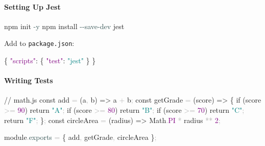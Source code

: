 \documentclass[
  justified,
  openright,
]{tufte-book}
\let\subsubsection\paragraph
\let\paragraph\paragraph
\newcommand{\AttributeTok}[1]{\textcolor{DarkSlateGray}{#1}}
\newcommand{\BuiltInTok}[1]{#1}
\newcommand{\CommentTok}[1]{\textcolor{MidGray}{#1}}
\newcommand{\ConstantTok}[1]{\textcolor{Purple}{#1}}
\newcommand{\ControlFlowTok}[1]{\textcolor{BrandBlue}{#1}}
\newcommand{\DataTypeTok}[1]{\textcolor{Purple}{#1}}
\newcommand{\DecValTok}[1]{\textcolor{Purple}{#1}}
\newcommand{\ExtensionTok}[1]{#1}
\newcommand{\FunctionTok}[1]{\textcolor{BrandBlue}{#1}}
\newcommand{\KeywordTok}[1]{\textcolor{BrandBlue}{#1}}
\newcommand{\NormalTok}[1]{#1}
\newcommand{\OperatorTok}[1]{\textcolor{DarkGray}{#1}}
\newcommand{\StringTok}[1]{\textcolor{Teal}{#1}}
\newenvironment{Shaded}{%
  \begin{snugshade}
}{%
  \end{snugshade}
}
\let\subsubsection\paragraph
\let\paragraph\paragraph
\begin{document}
\subsubsection{Setting Up Jest}\label{setting-up-jest}

\begin{Shaded}
\begin{Highlighting}[]
\ExtensionTok{npm}\NormalTok{ init }\AttributeTok{{-}y}
\ExtensionTok{npm}\NormalTok{ install }\AttributeTok{{-}{-}save{-}dev}\NormalTok{ jest}
\end{Highlighting}
\end{Shaded}

Add to \texttt{package.json}:

\begin{Shaded}
\begin{Highlighting}[]
\FunctionTok{\{}
  \DataTypeTok{"scripts"}\FunctionTok{:} \FunctionTok{\{}
    \DataTypeTok{"test"}\FunctionTok{:} \StringTok{"jest"}
  \FunctionTok{\}}
\FunctionTok{\}}
\end{Highlighting}
\end{Shaded}

\subsubsection{Writing Tests}\label{writing-tests}

\begin{Shaded}
\begin{Highlighting}[]
\CommentTok{// math.js}
\KeywordTok{const}\NormalTok{ add }\OperatorTok{=}\NormalTok{ (a}\OperatorTok{,}\NormalTok{ b) }\KeywordTok{=\textgreater{}}\NormalTok{ a }\OperatorTok{+}\NormalTok{ b}\OperatorTok{;}
\KeywordTok{const}\NormalTok{ getGrade }\OperatorTok{=}\NormalTok{ (score) }\KeywordTok{=\textgreater{}}\NormalTok{ \{}
  \ControlFlowTok{if}\NormalTok{ (score }\OperatorTok{\textgreater{}=} \DecValTok{90}\NormalTok{) }\ControlFlowTok{return} \StringTok{"A"}\OperatorTok{;}
  \ControlFlowTok{if}\NormalTok{ (score }\OperatorTok{\textgreater{}=} \DecValTok{80}\NormalTok{) }\ControlFlowTok{return} \StringTok{"B"}\OperatorTok{;}
  \ControlFlowTok{if}\NormalTok{ (score }\OperatorTok{\textgreater{}=} \DecValTok{70}\NormalTok{) }\ControlFlowTok{return} \StringTok{"C"}\OperatorTok{;}
  \ControlFlowTok{return} \StringTok{"F"}\OperatorTok{;}
\NormalTok{\}}\OperatorTok{;}
\KeywordTok{const}\NormalTok{ circleArea }\OperatorTok{=}\NormalTok{ (radius) }\KeywordTok{=\textgreater{}} \BuiltInTok{Math}\OperatorTok{.}\ConstantTok{PI} \OperatorTok{*}\NormalTok{ radius }\OperatorTok{**} \DecValTok{2}\OperatorTok{;}

\NormalTok{module}\OperatorTok{.}\AttributeTok{exports} \OperatorTok{=}\NormalTok{ \{ add}\OperatorTok{,}\NormalTok{ getGrade}\OperatorTok{,}\NormalTok{ circleArea \}}\OperatorTok{;}
\end{Highlighting}
\end{Shaded}
\end{document}
